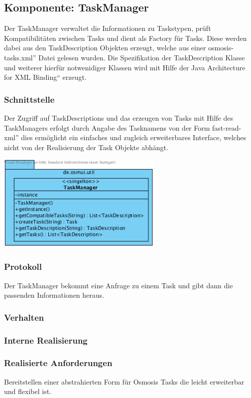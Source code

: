 \documentclass[a4paper,12pt]{scrartcl}
\begin{document}
\subsection{Komponente: TaskManager}
Der TaskManager verwaltet die Informationen zu Taskstypen, prüft Kompatibilitäten zwischen Tasks und dient als Factory für Tasks. Diese werden dabei aus den TaskDescription Objekten erzeugt, welche aus einer \glqq osmosis-tasks.xml'' Datei gelesen wurden. Die Spezifikation der TaskDescription Klasse und weiterer hierfür notwenidiger Klassen wird mit Hilfe
der \glqq Java Architecture for XML Binding`` erzeugt.
\subsubsection{Schnittstelle}
Der Zugriff auf TaskDescriptions und das erzeugen von Tasks mit Hilfe des TaskManagers erfolgt durch Angabe des Tasknamens
von der Form \glqq fast-read-xml'' dies ermöglicht ein einfaches und zugleich erweiterbares Interface, welches nicht von der Realisierung der Task Objekte abhängt.
\begin{center}
\includegraphics[width=8cm]{Schnittstelle_TaskManager.png}
\end{center}
\subsubsection{Protokoll}
Der TaskManager bekommt eine Anfrage zu einem Task und gibt dann die passenden Informationen heraus.
\subsubsection{Verhalten}
\subsubsection{Interne Realisierung}
\subsubsection{Realisierte Anforderungen}
Bereitstellen einer abstrahierten Form für Osmosis Tasks die leicht erweiterbar und flexibel ist.
\end{document}
